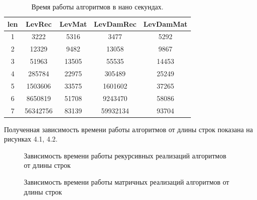\documentclass[12pt, a4paper]{report}
\begin{document}
\begin{table} [ht]
	\caption{Время работы алгоритмов в нано секундах.}
\begin{center}
\begin{tabular}{|c c c c c|} 
 	\hline
	len & LevRec & LevMat & LevDamRec & LevDamMat \\ [0.8ex] 
 	\hline
 	1 & 3222 & 5316 & 3477 & 5292\\
 	\hline
 	2 & 12329 & 9482 & 13058 & 9867\\
 	\hline
	3 & 51963&13505&55535&14453\\
	\hline
	4 & 285784&22975&305489&25249\\
	\hline
	5 & 1503606&33575&1601602&37265\\
	\hline
	6 & 8650819&51708&9243470&58086\\
	\hline
	7 & 56342756&83139&59932134&93704\\
	\hline
	\end{tabular}
\end{center}
\end{table}

Полученная зависимость времени работы алгоритмов от длины строк показана на рисунках 4.1, 4.2.


\begin{figure} [H]
\begin{center}
\caption{Зависимость времени работы рекурсивных реализаций алгоритмов от длины строк}
\end{center}
\end{figure}

\begin{figure} [H]
	\begin{center}
		\caption{Зависимость времени работы матричных реализаций алгоритмов от длины строк}
	\end{center}
\end{figure}
\end{document}
